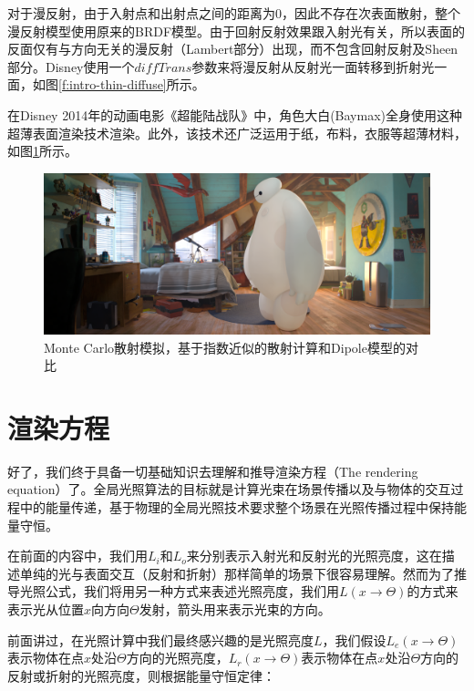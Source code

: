 对于漫反射，由于入射点和出射点之间的距离为0，因此不存在次表面散射，整个漫反射模型使用原来的BRDF模型。由于回射反射效果跟入射光有关，所以表面的反面仅有与方向无关的漫反射（Lambert部分）出现，而不包含回射反射及Sheen部分。Disney使用一个$diffTrans$参数来将漫反射从反射光一面转移到折射光一面，如图\ref{f:intro-thin-diffuse}所示。

在Disney 2014年的动画电影《超能陆战队》中，角色大白(Baymax)全身使用这种超薄表面渲染技术渲染。此外，该技术还广泛运用于纸，布料，衣服等超薄材料，如图\ref{f:intro-thin-baymax}所示。

\begin{figure}
	\includegraphics[width=1.\textwidth]{figures/intro/original-fullcomp-filtered}
	\caption{Monte Carlo散射模拟，基于指数近似的散射计算和Dipole模型的对比}
	\label{f:intro-thin-baymax}
\end{figure}





\section{渲染方程}\label{sec:intro-the-rendering-equation}
好了，我们终于具备一切基础知识去理解和推导渲染方程（The rendering equation）了。全局光照算法的目标就是计算光束在场景传播以及与物体的交互过程中的能量传递，基于物理的全局光照技术要求整个场景在光照传播过程中保持能量守恒。

在前面的内容中，我们用$L_i$和$L_o$来分别表示入射光和反射光的光照亮度，这在描述单纯的光与表面交互（反射和折射）那样简单的场景下很容易理解。然而为了推导光照公式，我们将用另一种方式来表述光照亮度，我们用$L(x\to\Theta)$的方式来表示光从位置$x$向方向$\Theta$发射，箭头用来表示光束的方向。

前面讲过，在光照计算中我们最终感兴趣的是光照亮度$L$，我们假设$L_e(x\to\Theta)$表示物体在点$x$处沿$\Theta$方向的光照亮度，$L_r(x\to\Theta)$表示物体在点$x$处沿$\Theta$方向的反射或折射的光照亮度，则根据能量守恒定律：

